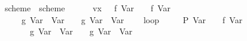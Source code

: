\documentclass{llncs}
\begin{document}
\begin{isabellebody}
\isanewline
{}\isamarkupfalse%
\ scheme{}\ \ {}scheme{}\ {}\isanewline
\ \ {}\ {}\ {}{}\ vx{}\ {}\ {}{}\ f\ {}Var\ {}{}{}\ {}\ {}{}\ f\ {}Var\ {}{}\isanewline
\ \ {}\ {}\ {}{}\ g\ {}Var\ {}{}\ {}Var\ {}{}{}\ {}\ {}{}\ g\ {}Var\ {}{}\ {}Var\ {}{}\isanewline
\ \ {}\ loop\isanewline
\ \ \ \ {}\ {}{}P\ {}Var\ {}{}{}{}\ {}\ {}{}\ f\ {}Var\ {}{}\isanewline
\ \ \ \ {}\ {}\ {}{}\ g\ {}Var\ {}{}\ {}Var\ {}{}{}\ {}\ {}{}\ g\ {}Var\ {}{}\ {}Var\ {}{}\isanewline

\end{isabellebody}
\end{document}
